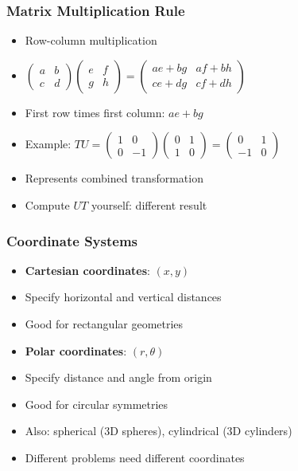 \begin{frame}[fragile]\frametitle{Matrix Multiplication Rule}
  \begin{itemize}
    \item Row-column multiplication
    \item $\begin{pmatrix} a & b \\ c & d \end{pmatrix} \begin{pmatrix} e & f \\ g & h \end{pmatrix} = \begin{pmatrix} ae+bg & af+bh \\ ce+dg & cf+dh \end{pmatrix}$
    \item First row times first column: $ae + bg$
    \item Example: $TU = \begin{pmatrix} 1 & 0 \\ 0 & -1 \end{pmatrix} \begin{pmatrix} 0 & 1 \\ 1 & 0 \end{pmatrix} = \begin{pmatrix} 0 & 1 \\ -1 & 0 \end{pmatrix}$
    \item Represents combined transformation
    \item Compute $UT$ yourself: different result
  \end{itemize}
\end{frame}

\begin{frame}[fragile]\frametitle{Coordinate Systems}
  \begin{itemize}
    \item \textbf{Cartesian coordinates}: $(x, y)$
    \item Specify horizontal and vertical distances
    \item Good for rectangular geometries
    \item \textbf{Polar coordinates}: $(r, \theta)$
    \item Specify distance and angle from origin
    \item Good for circular symmetries
    \item Also: spherical (3D spheres), cylindrical (3D cylinders)
    \item Different problems need different coordinates
  \end{itemize}
\end{frame}

